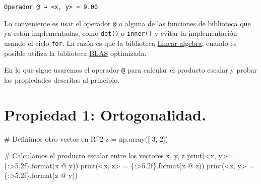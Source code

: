 \documentclass[
  letterpaper,
  DIV=11,
  numbers=noendperiod]{scrreprt}
\newenvironment{Shaded}{\begin{snugshade}}{\end{snugshade}}
\newcommand{\BuiltInTok}[1]{\textcolor[rgb]{0.00,0.23,0.31}{#1}}
\newcommand{\CommentTok}[1]{\textcolor[rgb]{0.37,0.37,0.37}{#1}}
\newcommand{\DecValTok}[1]{\textcolor[rgb]{0.68,0.00,0.00}{#1}}
\newcommand{\NormalTok}[1]{\textcolor[rgb]{0.00,0.23,0.31}{#1}}
\newcommand{\OperatorTok}[1]{\textcolor[rgb]{0.37,0.37,0.37}{#1}}
\newcommand{\SpecialCharTok}[1]{\textcolor[rgb]{0.37,0.37,0.37}{#1}}
\newcommand{\StringTok}[1]{\textcolor[rgb]{0.13,0.47,0.30}{#1}}
\begin{document}
\begin{verbatim}
Operador @ → <x, y> = 9.00
\end{verbatim}

Lo conveniente es usar el operador \texttt{@} o alguna de las funciones
de biblioteca que ya están implementadas, como \texttt{dot()} o
\texttt{inner()} y evitar la implementación usando el ciclo
\texttt{for}. La razón es que la biblioteca
\href{https://numpy.org/doc/stable/reference/routines.linalg.html\#module-numpy.linalg}{Linear
algebra}, cuando es posible utiliza la biblioteca
\href{https://www.netlib.org/blas/}{BLAS} optimizada.

En lo que sigue usaremos el operador \texttt{@} para calcular el
producto escalar y probar las propiedades descritas al principio.

\section{Propiedad 1: Ortogonalidad.}\label{propiedad-1-ortogonalidad.}

\begin{Shaded}
\begin{Highlighting}[]
\CommentTok{\# Definimos otro vector en R\^{}2}
\NormalTok{z }\OperatorTok{=}\NormalTok{ np.array([}\OperatorTok{{-}}\DecValTok{3}\NormalTok{, }\DecValTok{2}\NormalTok{])}
\end{Highlighting}
\end{Shaded}

\begin{Shaded}
\begin{Highlighting}[]
\CommentTok{\# Calculamos el producto escalar entre los vectores x, y, z}
\BuiltInTok{print}\NormalTok{(}\StringTok{\textquotesingle{}\textless{}x, y\textgreater{} = }\SpecialCharTok{\{:\textgreater{}5.2f\}}\StringTok{\textquotesingle{}}\NormalTok{.}\BuiltInTok{format}\NormalTok{(x }\OperatorTok{@}\NormalTok{ y))}
\BuiltInTok{print}\NormalTok{(}\StringTok{\textquotesingle{}\textless{}x, z\textgreater{} = }\SpecialCharTok{\{:\textgreater{}5.2f\}}\StringTok{\textquotesingle{}}\NormalTok{.}\BuiltInTok{format}\NormalTok{(x }\OperatorTok{@}\NormalTok{ z))}
\BuiltInTok{print}\NormalTok{(}\StringTok{\textquotesingle{}\textless{}z, y\textgreater{} = }\SpecialCharTok{\{:\textgreater{}5.2f\}}\StringTok{\textquotesingle{}}\NormalTok{.}\BuiltInTok{format}\NormalTok{(z }\OperatorTok{@}\NormalTok{ y))}
\end{Highlighting}
\end{Shaded}
\end{document}

